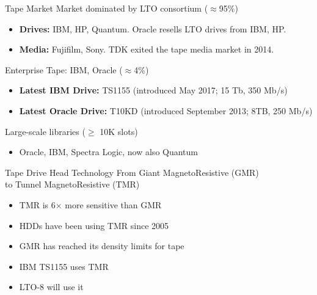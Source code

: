 \documentclass{beamer}
\begin{document}
\begin{frame}{Tape Market}{}
{\Large Market dominated by LTO consortium ($\approx$95\%)}

\begin{itemize}
   \item \textbf{Drives:} IBM, HP, Quantum. Oracle resells LTO drives from IBM, HP.
   \item \textbf{Media:} Fujifilm, Sony. TDK exited the tape media market in 2014.
\end{itemize}

{\Large Enterprise Tape: IBM, Oracle ($\approx$4\%)}

\begin{itemize}
   \item \textbf{Latest IBM Drive:} TS1155 (introduced May 2017; 15 Tb, 350 Mb/s)
   \item \textbf{Latest Oracle Drive:} T10KD (introduced September 2013; 8TB, 250 Mb/s)
\end{itemize}

{\Large Large-scale libraries ($\geq$ 10K slots)}

\begin{itemize}
   \item Oracle, IBM, Spectra Logic, now also Quantum
\end{itemize}
\end{frame}



\begin{frame}{Tape Drive Head Technology}{}
{\Large From Giant MagnetoResistive (GMR)\\
\hfill to Tunnel MagnetoResistive (TMR)}
\bigskip
\begin{itemize}
   \item TMR is 6$\times$ more sensitive than GMR
   \item HDDs have been using TMR since 2005
   \item GMR has reached its density limits for tape
   \item IBM TS1155 uses TMR
   \item LTO-8 will use it
\end{itemize}
\end{frame}
\end{document}

